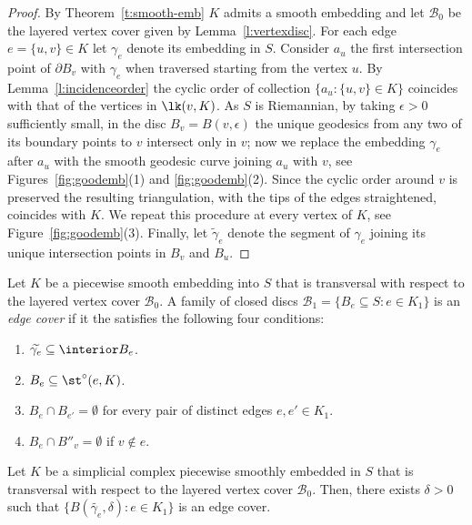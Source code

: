 \begin{proof}
    By Theorem~\ref{t:smooth-emb} $K$ admits a smooth embedding and 
    let $\mathcal{B}_0$ be the layered vertex cover given by Lemma~\ref{l:vertexdisc}. 
    For each edge $e=\{u,v\} \in K$ let $\gamma_e$ denote its embedding in $S$.
Consider $a_u$ the first intersection point of $\partial B_v$ with $\gamma_e$ when traversed starting from the vertex $u$.
By Lemma~\ref{l:incidenceorder} the cyclic order of collection $\{a_u\colon \{u,v\} \in K\}$ coincides with that of the vertices in $\lk(v,K)$.
As $S$ is Riemannian, by taking $\epsilon>0$ sufficiently small, in the disc $B_v=B(v,\epsilon)$ the unique geodesics from any two of its boundary points to $v$ intersect only in $v$; now we replace the embedding $\gamma_e$ after $a_u$ with the smooth geodesic curve joining $a_u$ with $v$, see Figures~\ref{fig:goodemb}(1) and \ref{fig:goodemb}(2).
Since the cyclic order around $v$ is preserved the resulting triangulation, with the tips of the edges straightened, coincides with $K$.
We repeat this procedure at every vertex of $K$, see Figure~\ref{fig:goodemb}(3).
Finally, let $\widetilde{\gamma}_e$ denote the segment of $\gamma_e$ joining its unique intersection points in $B_v$ and $B_u$.
\end{proof}
%
%
\begin{definition}
    Let $K$ be a piecewise smooth embedding into $S$ that is transversal with respect to the layered vertex cover $\mathcal{B}_0$. A family of closed discs $\mathcal{B}_1 = \{B_e \subseteq S\colon e\in K_1\}$ is an \emph{edge cover} if it the satisfies the following four conditions: 
    \begin{enumerate}
        \item $\widetilde{\gamma_e}\subseteq \interior B_e$.
        \item $B_e \subseteq \st^\circ(e,K)$.
        \item $B_e\cap B_{e'} = \emptyset$ for every pair of distinct edges $e,e'\in K_1$.
        \item $B_e\cap B''_v = \emptyset$ if $v\notin e$.
    \end{enumerate}
\end{definition}
%
\begin{lemma}
\label{l:edge-neigh}
    Let $K$ be a simplicial complex piecewise smoothly embedded in $S$ that is transversal with respect to the layered vertex cover $\mathcal{B}_0$. Then, there exists $\delta>0$ such that $\{B(\widetilde{\gamma_e},\delta) \colon e\in K_1\}$ is an edge cover.
\end{lemma}
